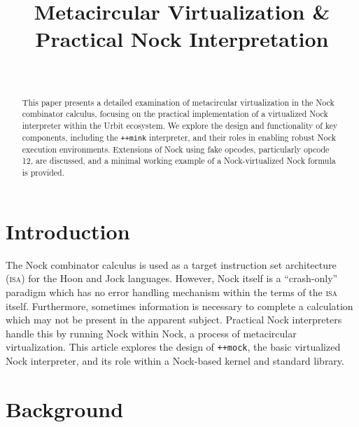 \documentclass[twoside]{article}
\title{Metacircular Virtualization \& \\ Practical Nock Interpretation}
\author{\authorname~\authorpatp \\ \affiliation}
\date{}
\begin{document}
\maketitle
\thispagestyle{firststyle}

\begin{abstract}
  \sloppy
  This paper presents a detailed examination of meta\-circular virtualization in the Nock combinator calculus, focusing on the practical implementation of a virtualized Nock interpreter within the Urbit ecosystem. We explore the design and functionality of key components, including the \lstinline[style=inlinecode]{++mink} interpreter, and their roles in enabling robust Nock execution environments.  Extensions of Nock using fake opcodes, particularly opcode 12, are discussed, and a minimal working example of a Nock-virtualized Nock formula is provided.
\end{abstract}

\setcounter{page}{71}

\tableofcontents

\section{Introduction}

The Nock combinator calculus is used as a target instruction set architecture (\textsc{isa}) for the Hoon and Jock languages.  However, Nock itself is a ``crash-only'' paradigm which has no error handling mechanism within the terms of the \textsc{isa} itself.  Furthermore, sometimes information is necessary to complete a calculation which may not be present in the apparent subject.  Practical Nock interpreters handle this by running Nock within Nock, a process of metacircular virtualization.  This article explores the design of \lstinline[style=inlinecode]{++mock}, the basic virtualized Nock interpreter, and its role within a Nock-based kernel and standard library.

\section{Background}
\end{document}
